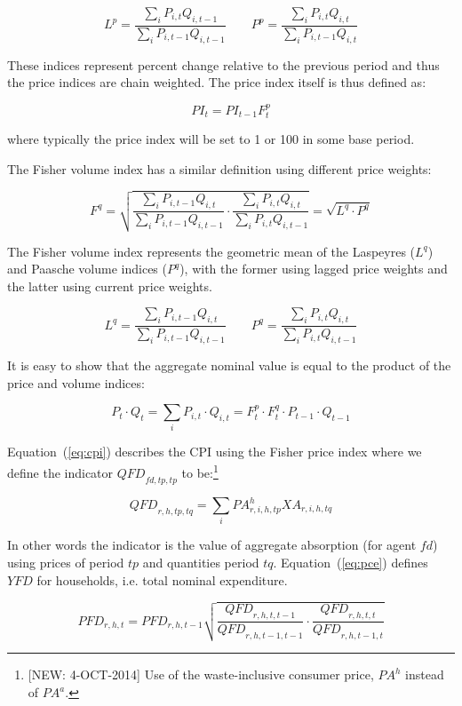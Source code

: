 \documentclass[11pt,letterpaper]{report}
\begin{document}
\[
L^p = \frac{\sum_i{P_{i,t} Q_{i,t-1}}}{\sum_i{P_{i,t-1} Q_{i,t-1}}} \qquad
P^p = \frac{\sum_i{P_{i,t} Q_{i,t}}}{\sum_i{P_{i,t-1} Q_{i,t}}}
\]

These indices represent percent change relative to the previous period and thus
the price indices are chain weighted. The price index itself is thus defined as:

\[
\mathit{PI}_t = \mathit{PI}_{t-1}F^p_t
\]

\noindent where typically the price index will be set to 1 or 100 in some base
period.

The Fisher volume index has a similar definition using different price weights:

\[
F^q =
\sqrt{
   \frac{\sum_i{P_{i,t-1} Q_{i,t}}}{\sum_i{P_{i,t-1} Q_{i,t-1}} } \cdot
   \frac{\sum_i{P_{i,t} Q_{i,t}}}{\sum_i{P_{i,t} Q_{i,t-1}} }
}
= \sqrt{L^q \cdot P^q}
\]

\noindent The Fisher volume index represents the geometric mean of the Laspeyres
($L^q$) and Paasche volume indices ($P^q$), with the former using lagged price
weights and the latter using current price weights.

\[
L^q = \frac{\sum_i{P_{i,t-1} Q_{i,t}}}{\sum_i{P_{i,t-1} Q_{i,t-1}}} \qquad
P^q = \frac{\sum_i{P_{i,t} Q_{i,t}}}{\sum_i{P_{i,t} Q_{i,t-1}}}
\]

\noindent It is easy to show that the aggregate nominal value is equal to the
product of the price and volume indices:

\[
P_t \cdot Q_t = \sum_i{P_{i,t} \cdot Q_{i,t}}
              =  F^p_t \cdot F^q_t \cdot P_{t-1} \cdot Q_{t-1}
\]

Equation~(\ref{eq:cpi}) describes the CPI using the Fisher price index where we
define the indicator $\mathit{QFD}_{\mathit{fd}, \mathit{tp}, \mathit{tp}}$ to
be:\footnote{[NEW: 4-OCT-2014] Use of the waste-inclusive consumer price, $\mathit{PA}^h$ instead of $\mathit{PA}^a$.}

\[
\mathit{QFD}_{r,\mathit{h}, \mathit{tp}, \mathit{tq}} =
\sum_i{
   \mathit{PA}^h_{r,i,\mathit{h}, \mathit{tp}}
   \mathit{XA}_{r,i,\mathit{h}, \mathit{tq}}
}
\]

\noindent In other words the indicator is the value of aggregate absorption (for
agent $\mathit{fd}$) using prices of period $\mathit{tp}$ and quantities period
$\mathit{tq}$. Equation~(\ref{eq:pce}) defines $\mathit{YFD}$ for households,
i.e. total nominal expenditure.

\begin{equation}
\label{eq:cpi}
\mathit{PFD}_{r,h,t} =
   \mathit{PFD_{r,h,t-1}}
   \sqrt{ \frac {\mathit{QFD}_{r,\mathit{h}, \mathit{t}, \mathit{t-1}}}
                 {\mathit{QFD}_{r,\mathit{h}, \mathit{t-1}, \mathit{t-1}}}
    \cdot \frac {\mathit{QFD}_{r,\mathit{h}, \mathit{t}, \mathit{t}}}
                {\mathit{QFD}_{r,\mathit{h}, \mathit{t-1}, \mathit{t}}}
   }
\end{equation}
\end{document}

